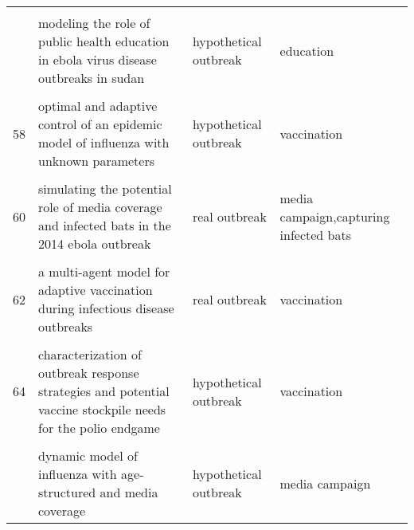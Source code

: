 \documentclass[
]{article}
\begin{document}
\begin{landscape}
\begin{longtable}{l>{\raggedright\arraybackslash}p{3cm}l>{\raggedright\arraybackslash}p{8cm}}
\cellcolor{gray!6}{55} & \cellcolor{gray!6}{mathematical models for devising the optimal ebola virus disease eradication} & \cellcolor{gray!6}{real outbreak} & \cellcolor{gray!6}{isolation,treatment,vaccination}\\
\addlinespace
56 & modeling the role of public health education in ebola virus disease outbreaks in sudan & hypothetical outbreak & education\\
\cellcolor{gray!6}{57} & \cellcolor{gray!6}{modelling the transmission and control strategies of varicella among school children in shenzhen, china} & \cellcolor{gray!6}{real outbreak} & \cellcolor{gray!6}{vaccination}\\
58 & optimal and adaptive control of an epidemic model of influenza with unknown parameters & hypothetical outbreak & vaccination\\
\cellcolor{gray!6}{59} & \cellcolor{gray!6}{simulating endogenous dynamics of intervention-capacity deployment: ebola outbreak in liberia} & \cellcolor{gray!6}{real outbreak} & \cellcolor{gray!6}{isolation,quarantine,safe burial,treatment,vaccination}\\
60 & simulating the potential role of media coverage and infected bats in the 2014 ebola outbreak & real outbreak & media campaign,capturing infected bats\\
\addlinespace
\cellcolor{gray!6}{61} & \cellcolor{gray!6}{a mathematical model of ebola virus disease: using sensitivity analysis to determine effective intervention targets} & \cellcolor{gray!6}{hypothetical outbreak} & \cellcolor{gray!6}{isolation,quarantine,safe burial}\\
62 & a multi-agent model for adaptive vaccination during infectious disease outbreaks & real outbreak & vaccination\\
\cellcolor{gray!6}{63} & \cellcolor{gray!6}{assessing the efficiency of movement restriction as a control strategy of ebola} & \cellcolor{gray!6}{hypothetical outbreak} & \cellcolor{gray!6}{travel restriction}\\
64 & characterization of outbreak response strategies and potential vaccine stockpile needs for the polio endgame & hypothetical outbreak & vaccination\\
\cellcolor{gray!6}{65} & \cellcolor{gray!6}{designing public health policies to mitigate the adverse consequences of rural-urban migration via meta-population modeling} & \cellcolor{gray!6}{hypothetical outbreak} & \cellcolor{gray!6}{vaccination}\\
\addlinespace
66 & dynamic model of influenza with age-structured and media coverage & hypothetical outbreak & media campaign\\

\end{longtable}
\end{landscape}
\end{document}
